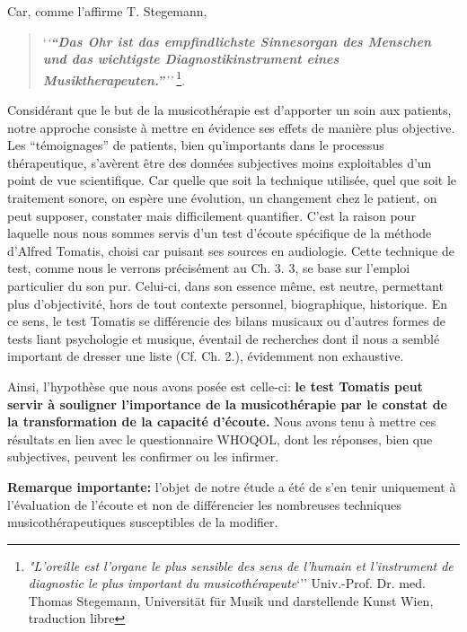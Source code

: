 Car, comme l'affirme T. Stegemann,

\begin{quotation}
	`\textit{`\textbf{``Das Ohr ist das empfindlichste
    Sinnesorgan des Menschen und das wichtigste Diagnostikinstrument
    eines Musiktherapeuten.''}''\autocite [44]{seminar_zuerich}}
\footnote{ \textit{"L'oreille est l'organe le plus sensible des sens de l'humain
et l'instrument de diagnostic  le plus important du
musicothérapeute}`''
Univ.-Prof. Dr. med. Thomas Stegemann, Universität für Musik und darstellende Kunst Wien, traduction libre}.
 \end{quotation}


Considérant que le but de la musicothérapie est d'apporter un soin aux patients,
notre  approche consiste à mettre en évidence ses effets de manière
plus objective. Les ``témoignages'' de patients, bien qu'importants dans le processus thérapeutique,
s'avèrent être des données subjectives moins exploitables d'un
point de vue scientifique. %
Car quelle que soit la technique utilisée, quel que soit
le traitement sonore, on espère une évolution, un changement chez le patient, on peut supposer, constater
 mais
 difficilement quantifier.
  C'est la raison pour laquelle
 nous nous sommes servis d'un test d'écoute
 spécifique de la méthode d'Alfred Tomatis, choisi car puisant ses
 sources en audiologie. Cette technique de test, comme nous le verrons précisément au Ch. 3. 3, se base sur l'emploi particulier du son pur.
 Celui-ci, dans son essence même, est neutre, permettant plus d'objectivité, hors de tout contexte personnel, biographique, historique. En ce sens, le test Tomatis se différencie des bilans musicaux ou d'autres formes de tests liant psychologie et musique, éventail de recherches dont il nous a semblé important de dresser une liste (Cf. Ch. 2.), évidemment non exhaustive.


 Ainsi, l'hypothèse que nous avons posée est celle-ci: \textbf{le test Tomatis peut servir à
 souligner l'importance de la musicothérapie
 par le constat de la transformation de la capacité d'écoute.}
Nous avons tenu à mettre ces résultats en lien avec le questionnaire  WHOQOL, dont les réponses, bien que subjectives, peuvent les confirmer ou les infirmer. %


\textbf{Remarque importante:} l'objet de notre étude a été de s'en tenir uniquement  à l'évaluation de l'écoute et non de différencier les nombreuses techniques musicothérapeutiques susceptibles de la modifier.

